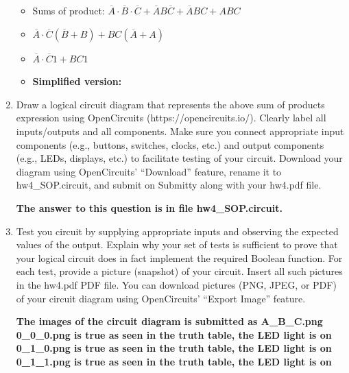 \documentclass{article}
\begin{document}
\begin{enumerate}
\begin{tabular}{c c c | c}
        \end{tabular}
        \begin{itemize}
            \item Sums of product: $\overline{A} \cdot \overline{B} \cdot \overline{C} + \overline{A}B\overline{C} + \overline{A}BC + ABC$
            \item $\overline{A} \cdot \overline{C} (\overline{B} + B) + BC(\overline{A} + A)$
            \item $\overline{A} \cdot \overline{C} 1 + BC 1$
            \item \textbf{Simplified version:} 
        \end{itemize}
        \item Draw a logical circuit diagram that represents the above sum of products expression
        using OpenCircuits (https://opencircuits.io/). Clearly label all inputs/outputs and all
        components. Make sure you connect appropriate input components (e.g., buttons, switches,
        clocks, etc.) and output components (e.g., LEDs, displays, etc.) to facilitate testing of
        your circuit. Download your diagram using OpenCircuits’ “Download” feature, rename it to
        hw4\_SOP.circuit, and submit on Submitty along with your hw4.pdf file.
        \begin{center}
            \textbf{The answer to this question is in file hw4\_SOP.circuit.}
        \end{center}
        \item Test you circuit by supplying appropriate inputs and observing the expected values of the
        output. Explain why your set of tests is sufficient to prove that your logical circuit does in
        fact implement the required Boolean function. For each test, provide a picture (snapshot) of
        your circuit. Insert all such pictures in the hw4.pdf PDF file. You can download pictures
        (PNG, JPEG, or PDF) of your circuit diagram using OpenCircuits’ “Export Image” feature.
        \begin{center}
            \textbf{The images of the circuit diagram is submitted as A\_B\_C.png}\\[0.25in]
            \textbf{0\_0\_0.png is true as seen in the truth table, the LED light is on}\\
            \textbf{0\_1\_0.png is true as seen in the truth table, the LED light is on}\\
            \textbf{0\_1\_1.png is true as seen in the truth table, the LED light is on}\\

\end{center}
\end{enumerate}
\end{document}
